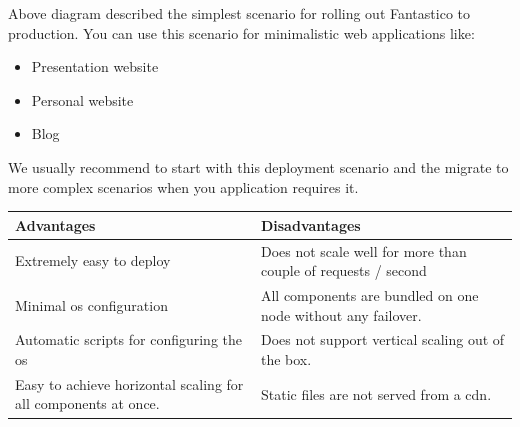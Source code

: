 \documentclass[letterpaper,10pt,english]{sphinxmanual}
\begin{document}
Above diagram described the simplest scenario for rolling out Fantastico to production. You can use this scenario
for minimalistic web applications like:
\begin{itemize}
\item {} 
Presentation website

\item {} 
Personal website

\item {} 
Blog

\end{itemize}

We usually recommend to start with this deployment scenario and the migrate to more complex scenarios when
you application requires it.

\begin{tabulary}{\linewidth}{|L|L|}
\hline
\textbf{\relax 
Advantages
} & \textbf{\relax 
Disadvantages
}\\\hline

Extremely easy to deploy
 & 
Does not scale well for more than couple of requests / second
\\\hline

Minimal os configuration
 & 
All components are bundled on one node without any failover.
\\\hline

Automatic scripts for configuring the os
 & 
Does not support vertical scaling out of the box.
\\\hline

Easy to achieve horizontal scaling for all components at once.
 & 
Static files are not served from a cdn.
\\\hline
\end{tabulary}
\end{document}
